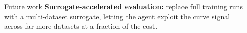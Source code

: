 \documentclass[final,20pt]{beamer}
\newlength{\sepwidth}
\newlength{\colwidth}
\newcommand{\separatorcolumn}{\begin{column}{\sepwidth}\end{column}}
\begin{document}
\begin{frame}[t]
\begin{columns}[t]
\begin{column}{\colwidth}
  \begin{exampleblock}{Future work}
    \textbf{Surrogate-accelerated evaluation:} replace full training runs with a
    multi-dataset surrogate, letting the agent exploit the curve signal across far
    more datasets at a fraction of the cost.
  \end{exampleblock}

\end{column}
\separatorcolumn

\end{columns}
\end{frame}
\end{document}
